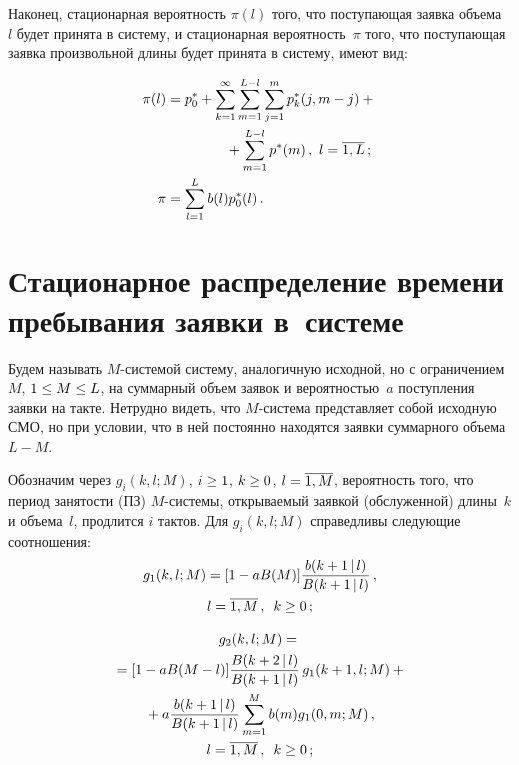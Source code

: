 \begin{multicols}{2}
Наконец, стационарная вероятность $\pi(l)$ того, что поступающая
заявка объема~$l$ будет принята в сис\-те\-му, и стационарная
вероятность~$\pi$ того, что по\-сту\-па\-ющая заявка
произвольной длины будет принята в сис\-те\-му, имеют вид:

\noindent
\begin{align*}
\pi(l)&= p^*_0 + \sum\limits_{k=1}^\infty \sum\limits_{m=1}^{L-l}
\sum\limits_{j=1}^{m} p^*_{k}(j,m-j) +{}\\
&\hspace*{15mm}{}+\sum\limits_{m=1}^{L-l} p^*(m)\,,\  l= \overline{1,L}\,;
\\
\pi &= \sum\limits_{l=1}^{L} b(l) p^*_0(l) \,.
\end{align*}

\section{Стационарное распределение времени
пребывания заявки в~системе}


Будем называть $M$-системой систему, аналогичную
исходной, но с ограничением~$M$, ${1\hm\le M\hm\le L}$,
на суммарный объем заявок и вероятностью~$a$
поступления заявки на такте. Нетрудно видеть, что $M$-сис\-те\-ма представляет собой
исходную СМО, но при условии, что в ней постоянно
находятся заявки суммарного объема $L-M$.


Обозначим через $g_i(k,l;M)$, $i\hm\ge 1$,
$k\hm\ge 0$, $l\hm=\overline{1,M}$,
вероятность того, что период занятости (ПЗ) $M$-сис\-те\-мы,
открываемый заявкой (обслуженной) длины~$k$ и объема~$l$,
продлится $i$ тактов. Для $g_i(k,l;M)$ справедливы следующие соотношения:
\begin{multline}
\label{4.1}
g_1(k,l;M) = [1 - a B(M)]\displaystyle\frac{\displaystyle b(k+1\,|\,l)\mathstrut}{\displaystyle B(k+1\,|\,l)\mathstrut}\,,\\
l= \overline{1,M}\,,\enskip  k\ge 0\,;
\end{multline}

\vspace*{-9pt}

\noindent
\begin{multline}
\label{4.2}
g_2(k,l;M)={}\\
{}= [1 - a B(M-l)]\displaystyle\frac{\displaystyle B(k+2\,|\,l) \mathstrut}{\displaystyle B(k+1\,|\,l)\mathstrut}
\, g_{1}(k+1,l;M)+{}\\
{}+
a \displaystyle\frac{\displaystyle b(k+1\,|\,l) \mathstrut}{\displaystyle  B(k+1\,|\,l)\mathstrut} \sum\limits_{m=1}^{M}
b(m) g_{1}(0,m;M)\,,\\  l= \overline{1,M}\,,\enskip  k\ge 0\,;
\end{multline}


\end{multicols}
